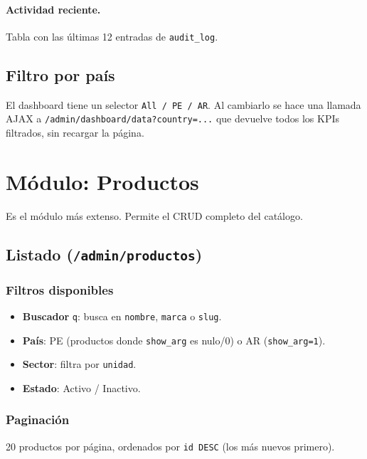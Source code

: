 \documentclass[11pt,a4paper]{article}
\begin{document}
\paragraph{Actividad reciente.} Tabla con las últimas 12 entradas de
\texttt{audit\_log}.

\subsection{Filtro por país}

El dashboard tiene un selector \texttt{All / PE / AR}. Al cambiarlo se
hace una llamada AJAX a \texttt{/admin/dashboard/data?country=...} que
devuelve todos los KPIs filtrados, sin recargar la página.

\section{Módulo: Productos}

Es el módulo más extenso. Permite el CRUD completo del catálogo.

\subsection{Listado (\texttt{/admin/productos})}

\subsubsection{Filtros disponibles}
\begin{itemize}[leftmargin=*]
    \item \textbf{Buscador} \texttt{q}: busca en \texttt{nombre},
        \texttt{marca} o \texttt{slug}.
    \item \textbf{País}: PE (productos donde \texttt{show\_arg} es nulo/0)
        o AR (\texttt{show\_arg=1}).
    \item \textbf{Sector}: filtra por \texttt{unidad}.
    \item \textbf{Estado}: Activo / Inactivo.
\end{itemize}

\subsubsection{Paginación}
20 productos por página, ordenados por \texttt{id DESC} (los más nuevos
primero).
\end{document}
